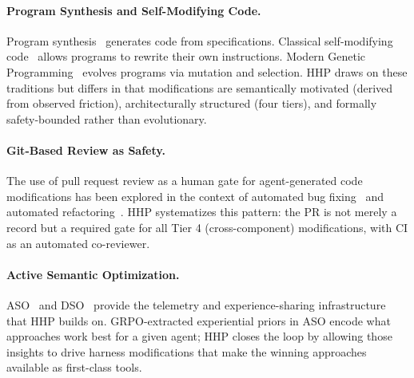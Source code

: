 \paragraph{Program Synthesis and Self-Modifying Code.}
Program synthesis~\cite{gulwani2017program} generates code from
specifications. Classical self-modifying code~\cite{holland1975adaptation}
allows programs to rewrite their own instructions. Modern Genetic
Programming~\cite{koza1994genetic} evolves programs via mutation and selection.
HHP draws on these traditions but differs in that modifications are semantically
motivated (derived from observed friction), architecturally structured (four
tiers), and formally safety-bounded rather than evolutionary.

\paragraph{Git-Based Review as Safety.}
The use of pull request review as a human gate for agent-generated code
modifications has been explored in the context of automated bug
fixing~\cite{sobania2023analysis} and automated refactoring~\cite{bavishi2019autopandas}.
HHP systematizes this pattern: the PR is not merely a record but a required
gate for all Tier 4 (cross-component) modifications, with CI as an automated
co-reviewer.

\paragraph{Active Semantic Optimization.}
ASO~\cite{hanzo2026aso} and DSO~\cite{hanzo2026dso} provide the telemetry and
experience-sharing infrastructure that HHP builds on. GRPO-extracted experiential
priors in ASO encode what approaches work best for a given agent; HHP closes the
loop by allowing those insights to drive harness modifications that make the
winning approaches available as first-class tools.

